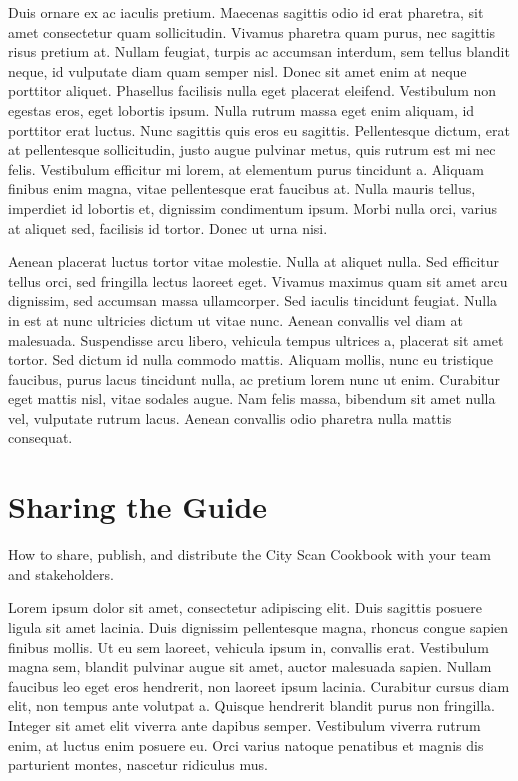 \documentclass[
  letterpaper,
  DIV=11,
  numbers=noendperiod]{scrreprt}
\begin{document}
Duis ornare ex ac iaculis pretium. Maecenas sagittis odio id erat
pharetra, sit amet consectetur quam sollicitudin. Vivamus pharetra quam
purus, nec sagittis risus pretium at. Nullam feugiat, turpis ac accumsan
interdum, sem tellus blandit neque, id vulputate diam quam semper nisl.
Donec sit amet enim at neque porttitor aliquet. Phasellus facilisis
nulla eget placerat eleifend. Vestibulum non egestas eros, eget lobortis
ipsum. Nulla rutrum massa eget enim aliquam, id porttitor erat luctus.
Nunc sagittis quis eros eu sagittis. Pellentesque dictum, erat at
pellentesque sollicitudin, justo augue pulvinar metus, quis rutrum est
mi nec felis. Vestibulum efficitur mi lorem, at elementum purus
tincidunt a. Aliquam finibus enim magna, vitae pellentesque erat
faucibus at. Nulla mauris tellus, imperdiet id lobortis et, dignissim
condimentum ipsum. Morbi nulla orci, varius at aliquet sed, facilisis id
tortor. Donec ut urna nisi.

Aenean placerat luctus tortor vitae molestie. Nulla at aliquet nulla.
Sed efficitur tellus orci, sed fringilla lectus laoreet eget. Vivamus
maximus quam sit amet arcu dignissim, sed accumsan massa ullamcorper.
Sed iaculis tincidunt feugiat. Nulla in est at nunc ultricies dictum ut
vitae nunc. Aenean convallis vel diam at malesuada. Suspendisse arcu
libero, vehicula tempus ultrices a, placerat sit amet tortor. Sed dictum
id nulla commodo mattis. Aliquam mollis, nunc eu tristique faucibus,
purus lacus tincidunt nulla, ac pretium lorem nunc ut enim. Curabitur
eget mattis nisl, vitae sodales augue. Nam felis massa, bibendum sit
amet nulla vel, vulputate rutrum lacus. Aenean convallis odio pharetra
nulla mattis consequat.

\chapter{Sharing the Guide}\label{sharing-the-guide}

How to share, publish, and distribute the City Scan Cookbook with your
team and stakeholders.

Lorem ipsum dolor sit amet, consectetur adipiscing elit. Duis sagittis
posuere ligula sit amet lacinia. Duis dignissim pellentesque magna,
rhoncus congue sapien finibus mollis. Ut eu sem laoreet, vehicula ipsum
in, convallis erat. Vestibulum magna sem, blandit pulvinar augue sit
amet, auctor malesuada sapien. Nullam faucibus leo eget eros hendrerit,
non laoreet ipsum lacinia. Curabitur cursus diam elit, non tempus ante
volutpat a. Quisque hendrerit blandit purus non fringilla. Integer sit
amet elit viverra ante dapibus semper. Vestibulum viverra rutrum enim,
at luctus enim posuere eu. Orci varius natoque penatibus et magnis dis
parturient montes, nascetur ridiculus mus.
\end{document}
